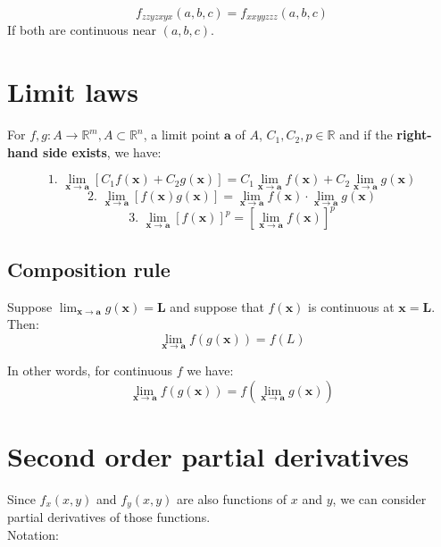 \documentclass[11pt]{article}
\begin{document}
\[f_{zzyzxyx} (a, b, c) = f_{xxyyzzz} (a, b, c)\]
If both are continuous near \((a, b, c)\).


\section{Limit laws}
\label{sec:orgd705e5a}
For \(f, g : A \rightarrow \mathbb{R}^m, A \subset \mathbb{R}^n\), a limit point \(\boldsymbol{a}\) of \(A\), \(C_1, C_2, p \in \mathbb{R}\) and if the \textbf{right-hand side exists}, we have:

\[\text{1. } \lim_{\boldsymbol{x} \rightarrow \boldsymbol{a}} [C_1 f(\boldsymbol{x}) + C_2 g(\boldsymbol{x})] = C_1 \lim_{\boldsymbol{x} \rightarrow \boldsymbol{a}} f(\boldsymbol{x}) + C_2 \lim_{\boldsymbol{x} \rightarrow \boldsymbol{a}} g(\boldsymbol{x})\]
\[\text{2. } \lim_{\boldsymbol{x} \rightarrow \boldsymbol{a}} [f(\boldsymbol{x}) g(\boldsymbol{x})] = \lim_{\boldsymbol{x} \rightarrow \boldsymbol{a}} f(\boldsymbol{x}) \cdot \lim_{\boldsymbol{x} \rightarrow \boldsymbol{a}} g(\boldsymbol{x})\]
\[\text{3. } \lim_{\boldsymbol{x} \rightarrow \boldsymbol{a}} [f(\boldsymbol{x})]^p = \left[\lim_{\boldsymbol{x} \rightarrow \boldsymbol{a}} f(\boldsymbol{x}) \right]^p\]

\subsection{Composition rule}
\label{sec:org92177a1}
Suppose \(\lim_{\boldsymbol{x} \rightarrow \boldsymbol{a}} g(\boldsymbol{x}) = \boldsymbol{L}\) and suppose that \(f(\boldsymbol{x})\) is continuous at \(\boldsymbol{x} = \boldsymbol{L}\). Then:
\[\lim_{\boldsymbol{x} \rightarrow \boldsymbol{a}} f(g(\boldsymbol{x})) = f(L)\]

In other words, for continuous \(f\) we have:
\[\lim_{\boldsymbol{x} \rightarrow \boldsymbol{a}} f(g(\boldsymbol{x})) = f \left(\lim_{\boldsymbol{x} \rightarrow \boldsymbol{a}} g(\boldsymbol{x}) \right)\]

\newpage

\section{Second order partial derivatives}
\label{sec:org34019e3}
Since \(f_x(x, y)\) and \(f_y(x, y)\) are also functions of \(x\) and \(y\), we can consider partial derivatives of those functions.
\\[0pt]

Notation:
\\[0pt]
\end{document}
